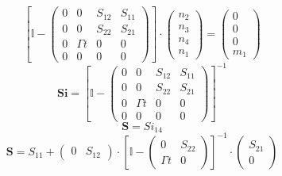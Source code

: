 \[ \left[ \mathbb{I}  - \left(\begin{array}{cccc} 0 & 0 & S_{12} &
S_{11} \\ 0 & 0 & S_{22} & S_{21} \\ 0 & \Gamma t & 0 & 0 \\ 0 & 0 & 0
& 0 \end{array}\right)\right] \cdot \left(\begin{array}{c} n_{2} \\
n_{3} \\ n_{4} \\ n_{1} \end{array}\right) = \left(\begin{array}{c} 0
\\ 0 \\ 0 \\ m_{1} \end{array}\right) \]
\[ \mathbf{Si} = \left[ \mathbb{I}  - \left(\begin{array}{cccc} 0 & 0
& S_{12} & S_{11} \\ 0 & 0 & S_{22} & S_{21} \\ 0 & \Gamma t & 0 & 0
\\ 0 & 0 & 0 & 0 \end{array}\right) \right]^{-1} \]
\[ \mathbf{S} = Si_{14} \]
\[ \mathbf{S} = S_{11} + \left(\begin{array}{cc} 0 & S_{12}
\end{array}\right) \cdot \left[ \mathbb{I}  - \left(\begin{array}{cc}
0 & S_{22} \\ \Gamma t & 0 \end{array}\right) \right]^{-1}
\cdot\left(\begin{array}{c} S_{21} \\ 0 \end{array}\right) \]
